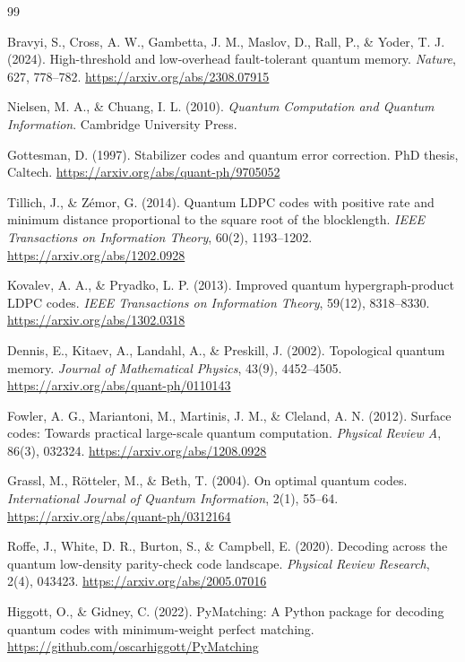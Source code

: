 \documentclass[twocolumn,10pt]{article}
\begin{document}
\begin{thebibliography}{99}

Bravyi, S., Cross, A. W., Gambetta, J. M., Maslov, D., Rall, P., \& Yoder, T. J. (2024).
High-threshold and low-overhead fault-tolerant quantum memory.
\textit{Nature}, 627, 778--782.
\url{https://arxiv.org/abs/2308.07915}

Nielsen, M. A., \& Chuang, I. L. (2010).
\textit{Quantum Computation and Quantum Information}.
Cambridge University Press.

Gottesman, D. (1997).
Stabilizer codes and quantum error correction.
PhD thesis, Caltech.
\url{https://arxiv.org/abs/quant-ph/9705052}

Tillich, J., \& Z\'emor, G. (2014).
Quantum LDPC codes with positive rate and minimum distance proportional to the square root of the blocklength.
\textit{IEEE Transactions on Information Theory}, 60(2), 1193--1202.
\url{https://arxiv.org/abs/1202.0928}

Kovalev, A. A., \& Pryadko, L. P. (2013).
Improved quantum hypergraph-product LDPC codes.
\textit{IEEE Transactions on Information Theory}, 59(12), 8318--8330.
\url{https://arxiv.org/abs/1302.0318}

Dennis, E., Kitaev, A., Landahl, A., \& Preskill, J. (2002).
Topological quantum memory.
\textit{Journal of Mathematical Physics}, 43(9), 4452--4505.
\url{https://arxiv.org/abs/quant-ph/0110143}

Fowler, A. G., Mariantoni, M., Martinis, J. M., \& Cleland, A. N. (2012).
Surface codes: Towards practical large-scale quantum computation.
\textit{Physical Review A}, 86(3), 032324.
\url{https://arxiv.org/abs/1208.0928}

Grassl, M., R\"otteler, M., \& Beth, T. (2004).
On optimal quantum codes.
\textit{International Journal of Quantum Information}, 2(1), 55--64.
\url{https://arxiv.org/abs/quant-ph/0312164}

Roffe, J., White, D. R., Burton, S., \& Campbell, E. (2020).
Decoding across the quantum low-density parity-check code landscape.
\textit{Physical Review Research}, 2(4), 043423.
\url{https://arxiv.org/abs/2005.07016}

Higgott, O., \& Gidney, C. (2022).
PyMatching: A Python package for decoding quantum codes with minimum-weight perfect matching.
\url{https://github.com/oscarhiggott/PyMatching}


\end{thebibliography}
\end{document}
